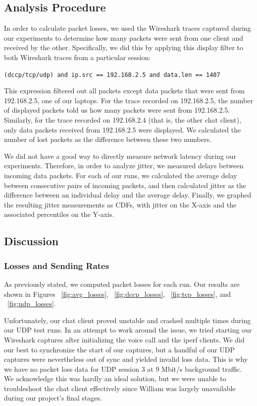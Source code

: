 \subsection{Analysis Procedure}

In order to calculate packet losses, we used the Wireshark traces captured
during our experiments to determine how many packets were sent from one client
and received by the other. Specifically, we did this by applying this display
filter to both Wireshark traces from a particular session:

\texttt{(dccp/tcp/udp) and ip.src == 192.168.2.5 and data.len == 1407}

This expression filtered out all packets except data packets that were sent from
192.168.2.5, one of our laptops. For the trace recorded on 192.168.2.5, the
number of displayed packets told us how many packets were sent from 192.168.2.5.
Similarly, for the trace recorded on 192.168.2.4 (that is, the other chat
client), only data packets received from 192.168.2.5 were displayed. We
calculated the number of lost packets as the difference between these two
numbers.

We did not have a good way to directly measure network latency during our
experiments. Therefore, in order to analyze jitter, we measured delays between
incoming data packets. For each of our runs, we calculated the average delay
between consecutive pairs of incoming packets, and then calculated jitter as the
difference between an individual delay and the average delay. Finally, we
graphed the resulting jitter measurements as CDFs, with jitter on the X-axis and
the associated percentiles on the Y-axis.

\subsection{Discussion}

\subsubsection{Losses and Sending Rates}

As previously stated, we computed packet losses for each run. Our results are
shown in Figures ~\ref{fig:avg_losses}, ~\ref{fig:dccp_losses},
~\ref{fig:tcp_losses}, and ~\ref{fig:udp_losses}.

Unfortunately, our chat client proved unstable and crashed multiple times during
our UDP test runs. In an attempt to work around the issue, we tried starting our
Wireshark captures after initializing the voice call and the iperf clients. We
did our best to synchronize the start of our captures, but a handful of our UDP
captures were nevertheless out of sync and yielded invalid loss data. This is
why we have no packet loss data for UDP session 3 at 9 Mbit/s background
traffic. We acknowledge this was hardly an ideal solution, but we were unable to
troubleshoot the chat client effectively since William was largely unavailable
during our project's final stages.

